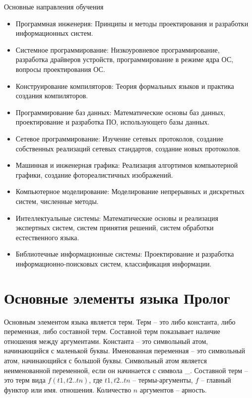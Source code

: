 Основные направления обучения
\begin{itemize}
	\item Программная инженерия: Принципы и методы проектирования и разработки информационных систем.
	\item Системное программирование:  Низкоуровневое программирование, разработка драйверов устройств, программирование в режиме ядра ОС, вопросы проектирования ОС.
	\item Конструирование компиляторов: Теория формальных языков и практика создания компиляторов.
	\item Программирование баз данных: Математические основы баз данных, проектирование и разработка ПО, использующего базы данных.

	\item Сетевое программирование:
	Изучение сетевых протоколов, создание собственных реализаций сетевых стандартов, создание новых протоколов.
	
	\item Машинная и инженерная графика:
	Реализация алгортимов компьютерной графики, создание фотореалистичных изображений.
	
	\item Компьютерное моделирование:
	Моделирование непрерывных и дискретных систем, численные методы.
	
	\item Интеллектуальные системы:
	Математические основы и реализация экспертных систем, систем принятия решений, систем обработки естественного языка.
	
	\item Библиотечные информационные системы:
	Проектирование и разработка информационно-поисковых систем, классификация информации.
\end{itemize}



















\section{Основные элементы языка Пролог}
Основным элементом языка является терм.
Терм -- это либо константа, либо переменная, либо составной терм. 
Составной терм показывает наличие отношения между аргументами. 
Константа -- это символьный атом, начинающийся с маленькой буквы. 
Именованная переменная -- это символьный атом, начинающийся с большой буквы. 
Символьный атом является неименованной переменной, если он начинается с символа \_. 
Составной терм -- это терм вида \(f(t1,t2..tn)\), где \(t1,t2..tn\) -- термы-аргументы, \(f\) -- главный функтор или имя. отношения. Количество \(n\) аргументов -- арность. 

